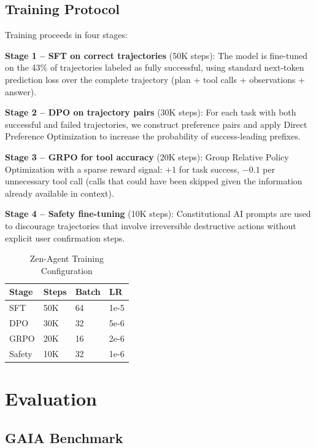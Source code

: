 \documentclass[11pt,a4paper]{article}
\begin{document}
\subsection{Training Protocol}

Training proceeds in four stages:

\textbf{Stage 1 -- SFT on correct trajectories} (50K steps): The model is fine-tuned on the
43\% of trajectories labeled as fully successful, using standard next-token prediction loss
over the complete trajectory (plan + tool calls + observations + answer).

\textbf{Stage 2 -- DPO on trajectory pairs} (30K steps): For each task with both successful
and failed trajectories, we construct preference pairs and apply Direct Preference Optimization
to increase the probability of success-leading prefixes.

\textbf{Stage 3 -- GRPO for tool accuracy} (20K steps): Group Relative Policy Optimization
with a sparse reward signal: $+1$ for task success, $-0.1$ per unnecessary tool call (calls
that could have been skipped given the information already available in context).

\textbf{Stage 4 -- Safety fine-tuning} (10K steps): Constitutional AI prompts are used to
discourage trajectories that involve irreversible destructive actions without explicit user
confirmation steps.

\begin{table}[H]
\centering
\begin{tabular}{llll}
\toprule
\textbf{Stage} & \textbf{Steps} & \textbf{Batch} & \textbf{LR} \\
\midrule
SFT & 50K & 64 & 1e-5 \\
DPO & 30K & 32 & 5e-6 \\
GRPO & 20K & 16 & 2e-6 \\
Safety & 10K & 32 & 1e-6 \\
\bottomrule
\end{tabular}
\caption{Zen-Agent Training Configuration}
\end{table}

\section{Evaluation}

\subsection{GAIA Benchmark}
\end{document}
